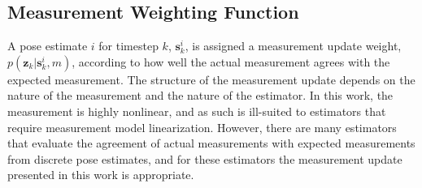 %

\subsection{Measurement Weighting Function}
\label{framework.Measurement.Weighting}

A pose estimate $i$ for timestep $k$, $\mathbf{s}_k^{i}$, is assigned a measurement update weight, $p(\mathbf{z}_k | \mathbf{s}_k^{i}, m)$, according to how well the actual measurement agrees with the expected measurement.
The structure of the measurement update depends on the nature of the measurement and the nature of the estimator.
In this work, the measurement is highly nonlinear, and as such is ill-suited to estimators that require measurement model linearization.
However, there are many estimators that evaluate the agreement of actual measurements with expected measurements from discrete pose estimates, and for these estimators the measurement update presented in this work is appropriate.

